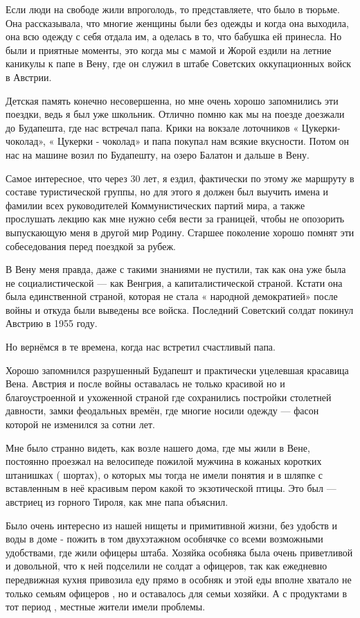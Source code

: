Если люди на свободе жили впроголодь, то представляете, что было в тюрьме. Она
рассказывала, что многие  женщины были без одежды и когда она выходила, она всю
одежду с себя отдала им, а оделась в то, что бабушка ей принесла. Но были и
приятные моменты, это когда мы с мамой и Жорой  ездили  на летние каникулы к
папе в Вену, где он служил в штабе Советских оккупационных войск в Австрии. 

Детская память конечно несовершенна, но мне очень хорошо запомнились эти
поездки, ведь я был уже школьник.  Отлично помню как мы на поезде доезжали до
Будапешта, где нас встречал папа. Крики на вокзале лоточников «
Цукерки-чоколад», « Цукерки - чоколад» и папа покупал нам всякие вкусности.
Потом он нас на машине возил по Будапешту, на озеро Балатон  и дальше в Вену.

Самое интересное, что через 30 лет, я ездил, фактически по этому же маршруту в
составе туристической  группы, но для этого я должен был выучить имена и
фамилии всех руководителей Коммунистических партий мира, а также прослушать
лекцию как мне нужно себя вести за границей, чтобы не опозорить выпускающую
меня в другой мир  Родину. Старшее поколение хорошо  помнят эти собеседования
перед поездкой за рубеж. 

В Вену меня правда, даже с такими знаниями не пустили, так как она уже была не
социалистической — как Венгрия, а капиталистической страной. Кстати она  была
единственной страной, которая не стала « народной демократией» после войны и
откуда были выведены все войска.  Последний Советский солдат покинул Австрию в
1955 году.

Но вернёмся в те времена, когда нас встретил счастливый папа. 

Хорошо запомнился разрушенный Будапешт и практически уцелевшая красавица Вена.
Австрия и после войны оставалась не только красивой но и благоустроенной и
ухоженной страной где сохранились постройки столетней давности, замки
феодальных времён, где многие носили одежду — фасон которой не изменился за
сотни лет. 

Мне было странно видеть, как возле нашего дома, где мы жили в Вене, постоянно
проезжал на велосипеде пожилой мужчина  в кожаных коротких штанишках ( шортах),
о которых мы тогда не имели понятия и  в  шляпке с вставленным в неё красивым
пером какой то экзотической птицы. Это был —австриец из горного Тироля, как мне
папа объяснил.

Было очень интересно из нашей нищеты  и примитивной жизни, без удобств  и воды
в доме  - пожить в том двухэтажном особнячке со всеми возможными удобствами,
где жили офицеры штаба. Хозяйка особняка была очень приветливой и довольной,
что к ней подселили не солдат а офицеров, так как ежедневно передвижная кухня
привозила еду прямо в особняк и этой еды вполне хватало не только семьям
офицеров , но и оставалось для  семьи хозяйки. А с продуктами в тот период ,
местные жители имели проблемы.

